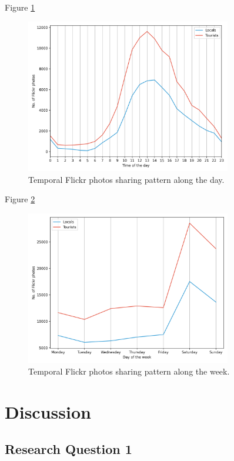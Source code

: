 \documentclass{article}
\begin{document}
Figure \ref{fig:flickr_trend_day}
\begin{figure}
\centering
\includegraphics[width=0.8\textwidth]{figures/flickr_trend_day.png}
\caption{\label{fig:flickr_trend_day}Temporal Flickr photos sharing pattern along the day.}
\end{figure}

Figure \ref{fig:flickr_trend_week}
\begin{figure}
\centering
\includegraphics[width=0.8\textwidth]{figures/flickr_trend_week.png}
\caption{\label{fig:flickr_trend_week}Temporal Flickr photos sharing pattern along the week.}
\end{figure}
\newpage


\section{Discussion}
\subsection{Research Question 1}
\end{document}
